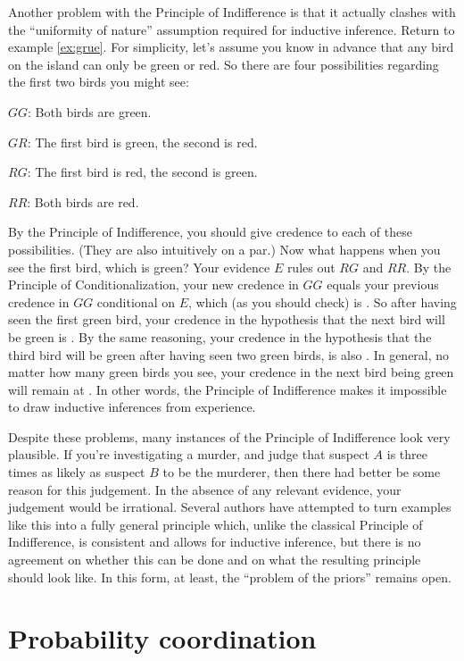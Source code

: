 Another problem with the Principle of Indifference is that it actually
clashes with the ``uniformity of nature'' assumption required for
inductive inference. Return to example \ref{ex:grue}. For simplicity,
let's assume you know in advance that any bird on the island can only
be green or red. So there are four possibilities regarding the first
two birds you might see:
\begin{enumerate*}
\item[$GG$:] Both birds are green.
\item[$GR$:] The first bird is green, the second is red.
\item[$RG$:] The first bird is red, the second is green.
\item[$RR$:] Both birds are red. 
\end{enumerate*}
By the Principle of Indifference, you should give credence
 to each of these possibilities. (They are also
intuitively on a par.) Now what happens when you see the first bird,
which is green? Your evidence $E$ rules out $RG$ and $RR$. By the
Principle of Conditionalization, your new credence in $GG$ equals your
previous credence in $GG$ conditional on $E$, which (as you should
check) is . So after having seen the first green bird,
your credence in the hypothesis that the next bird will be green is
.  By the same reasoning, your credence in the
hypothesis that the third bird will be green after having seen two
green birds, is also . In general, no matter how many
green birds you see, your credence in the next bird being green will
remain at . In other words, the Principle of
Indifference makes it impossible to draw inductive inferences from
experience.

Despite these problems, many instances of the Principle of
Indifference look very plausible. If you're investigating a murder,
and judge that suspect $A$ is three times as likely as suspect $B$ to
be the murderer, then there had better be some reason for this
judgement. In the absence of any relevant evidence, your judgement
would be irrational. Several authors have attempted to turn examples
like this into a fully general principle which, unlike the classical
Principle of Indifference, is consistent and allows for inductive
inference, but there is no agreement on whether this can be done and
on what the resulting principle should look like. In this form, at
least, the ``problem of the priors'' remains open.

\section{Probability coordination}

